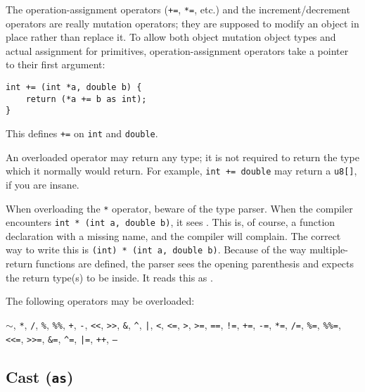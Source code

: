 \documentclass{article}
\begin{document}
The operation-assignment operators (\texttt{+=}, \texttt{*=}, etc.) and the
increment/decrement operators are really
mutation operators; they are supposed to modify an object in place rather than
replace it. To allow both object mutation object types and actual assignment
for primitives, operation-assignment operators take a pointer to their first
argument:

\begin{verbatim}
int += (int *a, double b) {
    return (*a += b as int);
}
\end{verbatim}

This defines \texttt{+=} on \texttt{int} and \texttt{double}.

An overloaded operator may return any type; it is not required to return the
type which it normally would return. For example, \texttt{int += double}
may return a \texttt{u8[]}, if you are insane.

When overloading the \texttt{*} operator, beware of the type parser.
When the compiler encounters \texttt{int~*~(int~a,~double~b)}, it sees
 . This is, of course,
a function declaration with a missing name, and the compiler will complain. The
correct way to write this is \texttt{(int)~*~(int~a,~double~b)}. Because of the
way multiple-return functions are defined, the parser sees the opening
parenthesis and expects the return type(s) to be inside. It reads this as
 \fbox{*} .

The following operators may be overloaded:

\texttt{$\sim$},
\texttt{*},
\texttt{/},
\texttt{\%},
\texttt{\%\%},
\texttt{+},
\texttt{-},
\texttt{<<},
\texttt{>>},
\texttt{\&},
\texttt{\^},
\texttt{|},
\texttt{<},
\texttt{<=},
\texttt{>},
\texttt{>=},
\texttt{==},
\texttt{!=},
\texttt{+=},
\texttt{-=},
\texttt{*=},
\texttt{/=},
\texttt{\%=},
\texttt{\%\%=},
\texttt{<<=},
\texttt{>>=},
\texttt{\&=},
\texttt{\^{}=},
\texttt{|=},
\texttt{++},
\texttt{--}

\subsection{Cast (\texttt{as})}
\label{sub:operators:cast}

\end{document}
